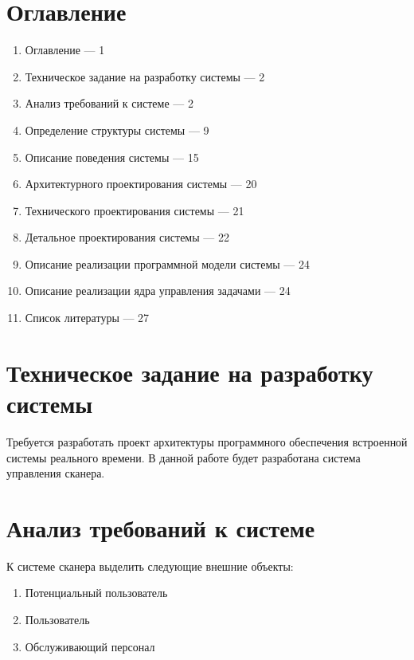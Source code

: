 \documentclass[12pt]{article}
\let\oldsection\section
\renewcommand{\section}[1]{
    \oldsection{#1}
    \setcounter{table}{0}
    \setcounter{figure}{0}
}
\begin{document}
    \section{Оглавление}

    \begin{enumerate}
        \item Оглавление --- 1
        \item Техническое задание на разработку системы --- 2
        \item Анализ требований к системе --- 2
        \item Определение структуры системы --- 9
        \item Описание поведения системы --- 15
        \item Архитектурного проектирования системы --- 20
        \item Технического проектирования системы --- 21
        \item Детальное проектирования системы --- 22
        \item Описание реализации программной модели системы --- 24
        \item Описание реализации ядра управления задачами --- 24
        \item Список литературы --- 27
    \end{enumerate}

    \newpage

    \section{Техническое задание на разработку системы}

    Требуется разработать проект архитектуры программного обеспечения встроенной системы реального времени. В данной работе будет разработана система управления сканера.

    \section{Анализ требований к системе}

    К системе сканера выделить следующие внешние объекты:
    \begin{enumerate}
        \item Потенциальный пользователь
        \item Пользователь
        \item Обслуживающий персонал
    \end{enumerate}
\end{document}
